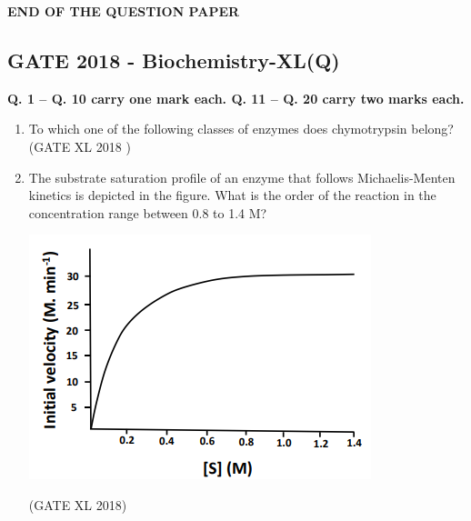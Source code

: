 \documentclass[14pt]{extarticle}
\begin{document}
\begin{flushleft}
\begin{enumerate}
\end{enumerate}
\begin{center}
    \textbf{END OF THE QUESTION PAPER}
\end{center}
\clearpage

\begin{center}
    
\section*{GATE 2018 - Biochemistry-XL(Q)}
\noindent\textbf{Q. 1 -- Q. 10 carry one mark each. Q. 11 -- Q. 20 carry two marks each.}
\end{center}
\begin{enumerate}[leftmargin=*]

\item To which one of the following classes of enzymes does chymotrypsin belong?\\
\hfill(GATE XL 2018 )\\
\begin{enumerate}[label=(\Alph*)]
\end{enumerate} 

\item The substrate saturation profile of an enzyme that follows Michaelis-Menten kinetics is depicted in the figure. What is the order of the reaction in the concentration range between 0.8 to 1.4 M?\\
\begin{center}
\includegraphics[scale=1]{fig16.png}\\
\end{center}
\hfill(GATE XL 2018)
\begin{enumerate}[label=(\Alph*)]
\end{enumerate}


\end{enumerate}
\end{flushleft}
\end{document}
